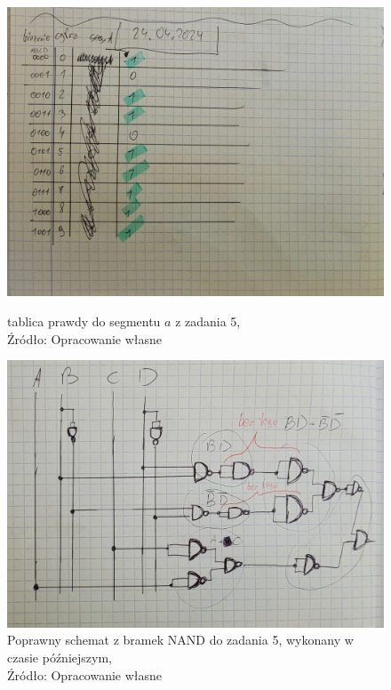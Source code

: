\documentclass{article}
\begin{document}
  \begin{figure}[!ht]
    \begin{minipage}{.5\textwidth}
      \centering
      \includegraphics[scale=0.06]{grafiki/notatki3.jpg}
      \caption{tablica prawdy do segmentu $a$ z zadania 5,
      \\Źródło: Opracowanie własne}
    \end{minipage}
    \begin{minipage}{.5\textwidth}
      \centering
      \includegraphics[scale=0.08]{grafiki/notatki4.jpg}
      \caption{ Poprawny schemat z bramek NAND do zadania 5, wykonany w czasie późniejszym,
      \\Źródło: Opracowanie własne}
    \end{minipage}
  \end{figure}
\end{document}
